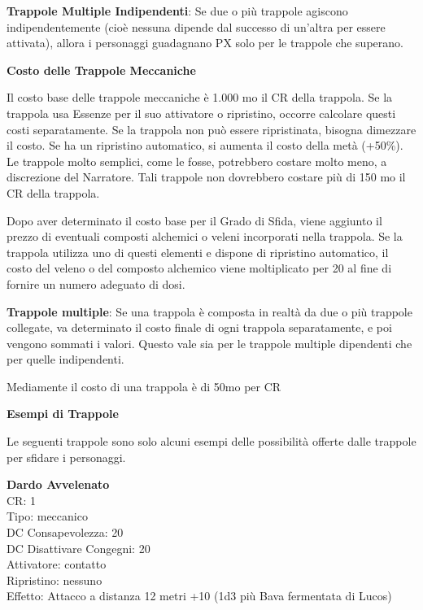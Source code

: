 \documentclass[a4paper,11pt,twoside,openany]{book}
\begin{document}
{\textbf{Trappole Multiple Indipendenti}: Se due o più trappole agiscono indipendentemente (cioè nessuna dipende dal successo di un'altra per essere attivata), allora i personaggi guadagnano PX solo per le trappole
che superano.

\textbf{Costo delle Trappole Meccaniche}

Il costo base delle trappole meccaniche è 1.000 mo \texttimes{} il CR della trappola. Se la trappola usa Essenze per il suo attivatore o ripristino, occorre calcolare questi costi separatamente. Se la trappola non può essere ripristinata, bisogna dimezzare il costo. Se ha un ripristino automatico, si aumenta il costo della metà (+50\%). Le trappole molto semplici, come le fosse, potrebbero costare molto meno, a discrezione del Narratore. Tali trappole non dovrebbero costare più di 150 mo \texttimes{} il CR della trappola. 

Dopo aver determinato il costo base per il Grado di Sfida, viene aggiunto il prezzo di eventuali composti alchemici o veleni incorporati nella trappola. Se la trappola utilizza uno di questi elementi e dispone di ripristino automatico, il costo del veleno o del composto alchemico viene moltiplicato per 20 al fine di fornire un numero adeguato di dosi.

\textbf{Trappole multiple}: Se una trappola è composta in realtà da due o più trappole collegate, va determinato il costo finale di ogni trappola separatamente, e poi vengono sommati i valori. Questo vale sia per le trappole multiple dipendenti che per quelle indipendenti.

Mediamente il costo di una trappola è di 50mo per CR

\pagebreak

\textbf{Esempi di Trappole}

Le seguenti trappole sono solo alcuni esempi delle possibilità offerte
dalle trappole per sfidare i personaggi.

\begin{multicols}{2}
	
\textbf{Dardo Avvelenato}\\
CR: 1 \\
Tipo: meccanico \\
DC Consapevolezza: 20 \\
DC Disattivare Congegni: 20 \\
Attivatore: contatto \\
Ripristino: nessuno \\
Effetto: Attacco a distanza 12 metri +10 (1d3 più Bava fermentata di Lucos)\\


\end{multicols}}
\end{document}
